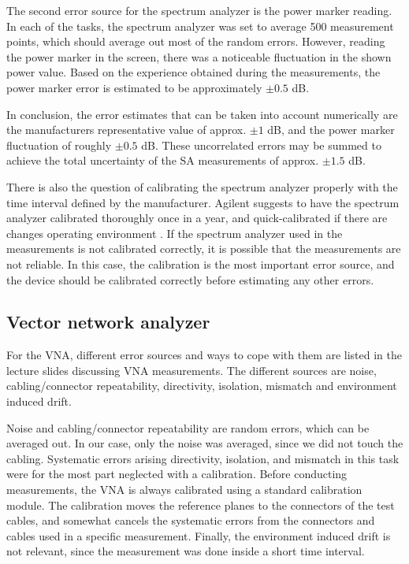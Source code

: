 \documentclass[a4paper, 12pt]{article}
\begin{document}
The second error source for the spectrum analyzer is the power marker reading. In 
each of the tasks, the spectrum analyzer was set to average 500 measurement points, 
which should average out most of the random errors. However, reading the power marker 
in the screen, there was a noticeable fluctuation in the shown power value. Based on the 
experience obtained during the measurements, the power marker error is estimated to be 
approximately $\pm 0.5$ dB.

In conclusion, the error estimates that can be taken into account numerically are 
the manufacturers representative value of approx. $\pm 1$ dB, and the power marker 
fluctuation of roughly $\pm 0.5$ dB. These uncorrelated errors may be summed to 
achieve the total uncertainty of the SA measurements of approx. $\pm 1.5$ dB. 

There is also the question of calibrating the spectrum analyzer properly with 
the time interval defined by the manufacturer. Agilent suggests to have the spectrum 
analyzer calibrated thoroughly once in a year, and quick-calibrated if there are 
changes operating environment \cite{sa2}. If the spectrum analyzer used in the 
measurements is not calibrated correctly, it is possible that the measurements are 
not reliable. In this case, the calibration is the most important error source, and 
the device should be calibrated correctly before estimating any other errors.


\subsection{Vector network analyzer}

For the VNA, different error sources and ways to cope with them are listed in the 
lecture slides discussing VNA measurements. The different sources are noise, 
cabling/connector repeatability, directivity, isolation, mismatch and environment 
induced drift. 

Noise and cabling/connector repeatability are random errors, which can be averaged 
out. In our case, only the noise was averaged, since we did not touch the cabling. 
Systematic errors arising directivity, isolation, and mismatch in this task were
for the most part neglected with a calibration. Before conducting measurements, 
the VNA is always calibrated using a standard calibration module. The calibration 
moves the reference planes to the connectors of the test cables, and somewhat 
cancels the systematic errors from the connectors and cables used in a specific 
measurement. Finally, the environment induced drift is not relevant, since the 
measurement was done inside a short time interval.
\end{document}
